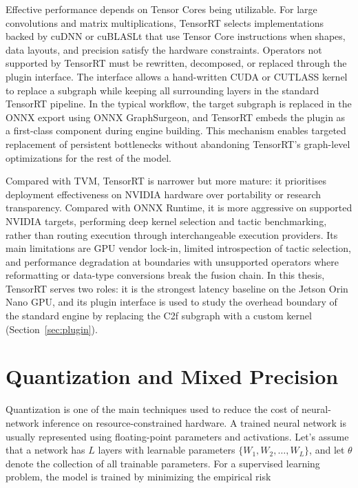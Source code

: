 \documentclass[12pt,a4paper]{report}
\begin{document}
Effective performance depends on Tensor Cores being utilizable.
For large convolutions and matrix multiplications, TensorRT selects implementations backed by cuDNN or cuBLASLt
that use Tensor Core instructions when shapes, data layouts, and precision satisfy the hardware constraints.
Operators not supported by TensorRT must be rewritten, decomposed, or replaced through the plugin interface.
The  interface allows a hand-written CUDA or CUTLASS kernel to replace a subgraph while keeping
all surrounding layers in the standard TensorRT pipeline.
In the typical workflow, the target subgraph is replaced in the ONNX export using ONNX GraphSurgeon, and TensorRT
embeds the plugin as a first-class component during engine building.
This mechanism enables targeted replacement of persistent bottlenecks without abandoning TensorRT's graph-level
optimizations for the rest of the model.

Compared with TVM, TensorRT is narrower but more mature: it prioritises deployment effectiveness on NVIDIA hardware
over portability or research transparency.
Compared with ONNX Runtime, it is more aggressive on supported NVIDIA targets, performing deep kernel selection
and tactic benchmarking, rather than routing execution through interchangeable execution providers.
Its main limitations are GPU vendor lock-in, limited introspection of tactic selection, and performance degradation
at boundaries with unsupported operators where reformatting or data-type conversions break the fusion chain.
In this thesis, TensorRT serves two roles: it is the strongest latency baseline on the Jetson Orin Nano GPU, and
its plugin interface is used to study the overhead boundary of the standard engine by replacing the C2f subgraph
with a custom kernel (Section~\ref{sec:plugin}).



\cleardoublepage
\section{Quantization and Mixed Precision}

Quantization is one of the main techniques used to reduce the cost of neural-network inference on
resource-constrained hardware. A trained neural network is usually represented using floating-point
parameters and activations. Let's assume that a network has $L$ layers with learnable parameters
$\{W_1, W_2, \ldots, W_L\}$, and let $\theta$ denote the collection of all trainable parameters.
For a supervised learning problem, the model is trained by minimizing the empirical risk
\end{document}
